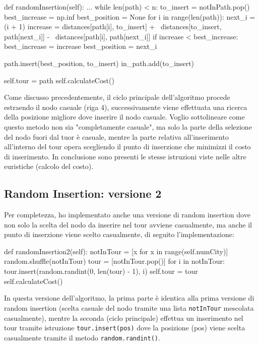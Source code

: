 \documentclass[a4paper,12pt]{report}
\begin{document}
\begin{python}
def randomInsertion(self):
  ...
  while len(path) < n:
    to_insert = notInPath.pop()
    best_increase = np.inf
    best_position = None
    for i in range(len(path)):
      next_i = (i + 1) %
      increase = distances[path[i], to_insert] + \
                 distances[to_insert, path[next_i]] - \
                 distances[path[i], path[next_i]]
      if increase < best_increase:
        best_increase = increase
        best_position = next_i

    path.insert(best_position, to_insert)
    in_path.add(to_insert)

  self.tour = path
  self.calculateCost()
\end{python}
Come discusso precedentemente, il ciclo principale dell'algoritmo procede estraendo il nodo casuale (riga 4), successivamente viene effettuata una ricerca della posizione migliore dove inserire il nodo casuale. Voglio sottolineare come questo metodo non sia "completamente casuale", ma solo la parte della selezione del nodo fuori dal tuor è casuale, mentre la parte relativa all'inserimento all'interno del tour opera scegliendo il punto di inserzione che minimizzi il costo di inserimento. \newline
In conclusione sono presenti le stesse istruzioni viste nelle altre euristiche (calcolo del costo).

\subsection{Random Insertion: versione 2}
Per completezza, ho implementato anche una versione di random insertion dove non solo la scelta del nodo da inserire nel tour avviene casualmente, ma anche il punto di inserzione viene scelto casualmente, di seguito l'implementazione:
\begin{python}
def randomInsertion2(self):
    notInTour = [x for x in range(self.numCity)]
    random.shuffle(notInTour)
    tour = [notInTour.pop()]
    for i in notInTour:
      tour.insert(random.randint(0, len(tour) - 1), i)
    self.tour = tour
    self.calculateCost()
\end{python}
In questa versione dell'algoritmo, la prima parte è identica alla prima versione di random insertion (scelta casuale del nodo tramite una lista \lstinline!notInTour! mescolata casualmente), mentre la seconda (ciclo principale) effettua un inserimento nel tour tramite istruzione \lstinline|tour.insert(pos)| dove la posizione (pos) viene scelta casualmente tramite il metodo \lstinline|random.randint()|.
\end{document}
